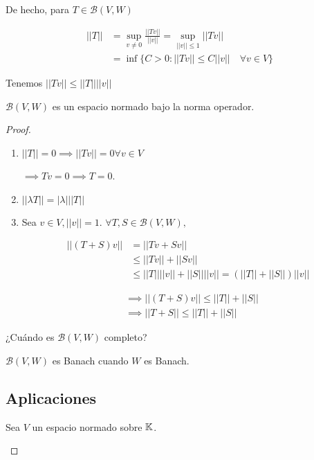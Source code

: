 \documentclass[../Apunte.tex]{subfiles}
\begin{document}
De hecho, para $T\in \mathcal{B}(V,W)$

\begin{align*}
    ||T||&=\sup_{v\neq 0} \frac{||Tv||}{||v||}=\sup_{||v||\leq 1} ||Tv||\\
    &=\inf \{C>0:||Tv||\leq C||v||\quad \forall v\in V\}
\end{align*}

Tenemos $||Tv||\leq ||T||||v||$

\begin{ftheorem}
    $\mathcal{B}(V,W)$ es un espacio normado bajo la norma operador.
\end{ftheorem}

\begin{proof}
    \begin{enumerate}
        \item $||T||=0\implies ||Tv||=0\forall v\in V$
         
        $\implies Tv=0\implies T=0$.

        \item $||\lambda T||=|\lambda| ||T||$

        \item Sea $v\in V,||v||=1$. $\forall T,S\in\mathcal{B}(V,W),$
        
        \begin{align*}||(T+S)v||&=||Tv+Sv||\\
        &\leq ||Tv||+||Sv||\\
        &\leq ||T|| ||v||+||S|| ||v||=(||T||+||S||)||v||\end{align*}

    \begin{align*}
        &\implies ||(T+S)v||\leq ||T||+||S||\\
        &\implies ||T+S||\leq ||T||+||S||
    \end{align*}
    \end{enumerate}

    ¿Cuándo es $\mathcal{B}(V,W)$ completo?

    \begin{ftheorem}
        $\mathcal{B}(V,W)$ es Banach cuando $W$ es Banach.
    \end{ftheorem}

    \subsection{Aplicaciones}

    \begin{fdefinition}
        Sea $V$ un espacio normado sobre $\mathbb{K}$.


\end{fdefinition}
\end{proof}
\end{document}
